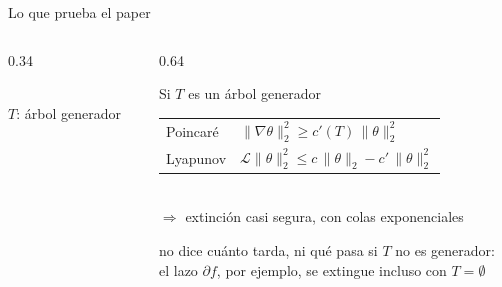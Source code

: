 \documentclass[aspectratio=169,11pt]{beamer}
\newcommand{\arbolkruskal}{0/4/1/4, 0/0/1/0, 2/0/2/1, 0/0/0/1, 2/2/2/3, 2/0/3/0, 2/2/3/2, 3/0/3/1,
  3/4/4/4, 1/4/2/4, 2/4/3/4, 0/2/0/3, 1/3/1/4, 4/2/4/3, 0/3/1/3, 1/0/1/1, 4/3/4/4, 1/2/1/3,
  2/3/3/3, 3/2/4/2, 4/0/4/1, 4/1/4/2, 3/1/3/2, 1/1/2/1}
\newcommand{\punto}[2]{\filldraw[#1, draw=white, line width=0.5pt] #2 circle (2.1pt)}
\newcommand{\dibujarT}[1]{%
  \foreach \i in {0,...,4} {\draw[grilla] (\i,0) -- (\i,4); \draw[grilla] (0,\i) -- (4,\i);}
  \foreach \xa/\ya/\xb/\yb [count=\n] in \arbolkruskal {%
    \ifnum\n<#1 \draw[verde, aristaT] (\xa,\ya) -- (\xb,\yb);\fi
    \ifnum\n=#1 \draw[verdeosc, aristaT] (\xa,\ya) -- (\xb,\yb);\fi}}
\begin{document}
\begin{frame}{Lo que prueba el paper}
  \begin{columns}[c]
    \begin{column}{0.34\textwidth}
      \centering
      \\[1mm]
      {\small \textcolor{verdeosc}{$T$}: árbol generador}
    \end{column}
    \begin{column}{0.64\textwidth}
      \begin{block}{Si $T$ es un árbol generador}
        \begin{tabular}{@{}ll@{}}
          {\small Poincaré} & $\|\nabla\theta\|_2^2\ge c'(T)\,\|\theta\|_2^2$\\[1.5mm]
          {\small Lyapunov} & $\mathcal{L}\|\theta\|_2^2\le c\,\|\theta\|_2-c'\,\|\theta\|_2^2$\\[1.5mm]
        \end{tabular}\\[1.5mm]
        $\Longrightarrow$ \alert{extinción casi segura}, con colas exponenciales
      \end{block}
      \vspace{3mm}
      {\small\color{cafeleche} no dice cuánto tarda, ni qué pasa si $T$ no es generador:\\
      el lazo $\partial f$, por ejemplo, se extingue incluso con $T=\emptyset$}
    \end{column}
  \end{columns}
\end{frame}
\end{document}
